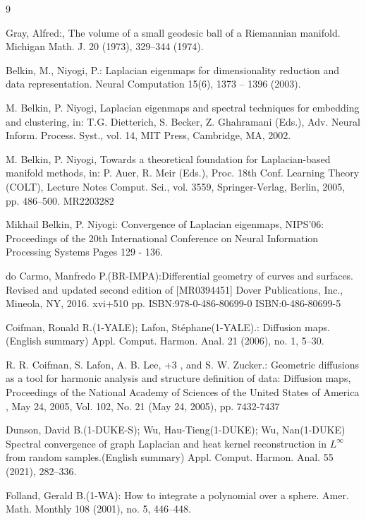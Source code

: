 \documentclass{amsart}
\theoremstyle{Theorem}
\theoremstyle{remark}
\numberwithin{equation}{section} \numberwithin{figure}{section}
\begin{document}
\begin{thebibliography}{9}\large

 Gray, Alfred:, The volume of a small geodesic ball of a Riemannian manifold.
Michigan Math. J. 20 (1973), 329–344 (1974).


 Belkin, M., Niyogi, P.: Laplacian eigenmaps for dimensionality reduction and data representation. Neural Computation 15(6), 1373 – 1396 (2003).

 M. Belkin, P. Niyogi, Laplacian eigenmaps and spectral techniques for embedding and clustering, in: T.G. Dietterich, S. Becker, Z. Ghahramani (Eds.), Adv. Neural Inform. Process. Syst., vol. 14, MIT Press, Cambridge, MA, 2002.

 M. Belkin, P. Niyogi, Towards a theoretical foundation for Laplacian-based manifold methods, in: P. Auer, R. Meir (Eds.), Proc. 18th Conf. Learning Theory (COLT), Lecture Notes Comput. Sci., vol. 3559, Springer-Verlag, Berlin, 2005, pp. 486–500.  MR2203282


 Mikhail Belkin, P. Niyogi: Convergence of Laplacian eigenmaps, NIPS'06: Proceedings of the 20th International Conference on Neural Information Processing Systems
Pages 129 - 136.


 do Carmo, Manfredo P.(BR-IMPA):Differential geometry of curves and surfaces. Revised and updated second edition of [MR0394451] Dover Publications, Inc., Mineola, NY, 2016. xvi+510 pp.
ISBN:978-0-486-80699-0
ISBN:0-486-80699-5

 Coifman, Ronald R.(1-YALE); Lafon, Stéphane(1-YALE).: Diffusion maps.(English summary) Appl. Comput. Harmon. Anal. 21 (2006), no. 1, 5–30.

 R. R. Coifman, S. Lafon, A. B. Lee, +3 , and S. W. Zucker.: Geometric diffusions as a tool for harmonic analysis and structure definition of data: Diffusion maps, Proceedings of the National Academy of Sciences of the United States of
America , May 24, 2005, Vol. 102, No. 21 (May 24, 2005), pp. 7432-7437

 Dunson, David B.(1-DUKE-S); Wu, Hau-Tieng(1-DUKE); Wu, Nan(1-DUKE)
Spectral convergence of graph Laplacian and heat kernel reconstruction in $L^{\infty}$ from random samples.(English summary)
Appl. Comput. Harmon. Anal. 55 (2021), 282–336.


 Folland, Gerald B.(1-WA): How to integrate a polynomial over a sphere. Amer. Math. Monthly 108 (2001), no. 5, 446–448.


\end{thebibliography}
\end{document}
